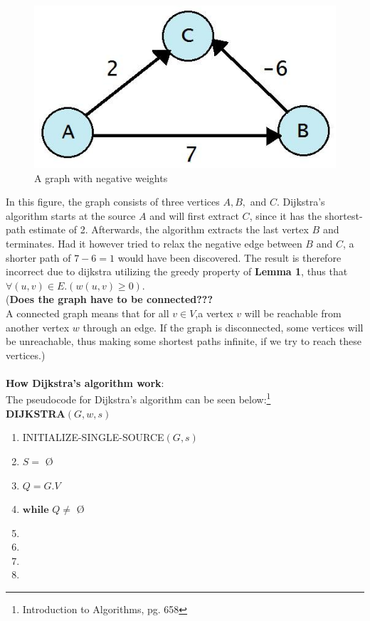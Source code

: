 \documentclass[11pt]{article}
\begin{document}
\begin{figure}[H]
\centering
\includegraphics[scale=0.3]{neg-weight.png}
\caption{A graph with negative weights}
\end{figure}

\noindent In this figure, the graph consists of three vertices $A, B,$ and $C$. Dijkstra's algorithm starts at the source $A$ and will first extract $C$, since it has the shortest-path estimate of 2. Afterwards, the algorithm extracts the last vertex $B$ and terminates. Had it however tried to relax the negative edge between $B$ and $C$, a shorter path of $7 - 6 = 1$ would have been discovered. The result is therefore incorrect due to dijkstra utilizing the greedy property of \textbf{Lemma 1}, thus that $\forall (u,v) \in E.(w(u,v) \geq 0)$. \\

\noindent
(\textbf{Does the graph have to be connected???}\\
A connected graph means that for all $v \in V $,a vertex $v$ will be reachable from another vertex $w$ through an edge. If the graph is disconnected, some vertices will be unreachable, thus making some shortest paths infinite, if we try to reach these vertices.)\\\\


\noindent
\textbf{How Dijkstra's algorithm work}:\\
The pseudocode for Dijkstra's algorithm can be seen below:\footnote{Introduction to Algorithms, pg. 658}\\

\textbf{DIJKSTRA$(G, w, s)$}
\begin{enumerate}
\setlength\itemsep{0em}
\item INITIALIZE-SINGLE-SOURCE$(G, s)$
\item $S = $ \O
\item $Q = G.V$
\item $\textbf{while } Q \neq$ \O
\item {}
\item {}
\item {}
\item \tab{}
\end{enumerate}
\end{document}

